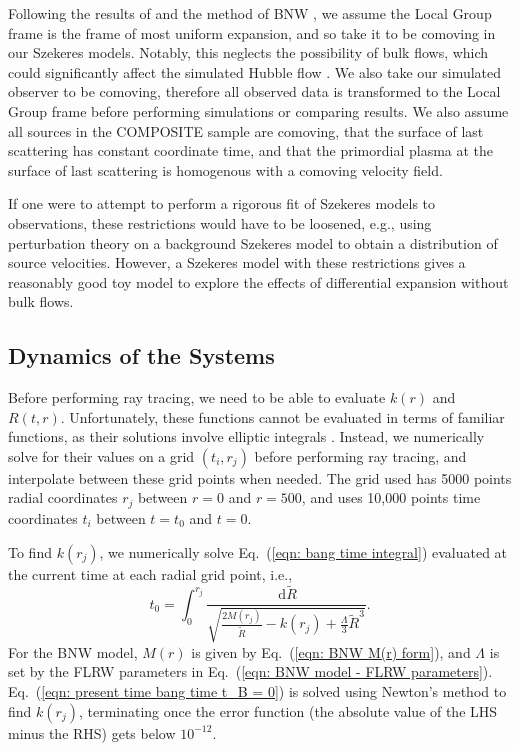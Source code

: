 \documentclass[a4paper,12pt]{report}
\newcommand{\diff}[1]{\,\text{d}{#1}}
\renewcommand{\eqref}[1]{Eq.~({#1})}
\begin{document}
Following the results of \cite{RN35,RN40} and the method of BNW \cite{RN3}, we assume the Local Group frame is the frame of most uniform expansion, and so take it to be comoving in our Szekeres models. Notably, this neglects the possibility of bulk flows, which could significantly affect the simulated Hubble flow \cite{RN122}. We also take our simulated observer to be comoving, therefore all observed data is transformed to the Local Group frame before performing simulations or comparing results. We also assume all sources in the COMPOSITE sample are comoving, that the surface of last scattering has constant coordinate time, and that the primordial plasma at the surface of last scattering is homogenous with a comoving velocity field.

If one were to attempt to perform a rigorous fit of Szekeres models to observations, these restrictions would have to be loosened, e.g., using perturbation theory on a background Szekeres model to obtain a distribution of source velocities. However, a Szekeres model with these restrictions gives a reasonably good toy model to explore the effects of differential expansion without bulk flows.

\subsection{Dynamics of the Systems}
Before performing ray tracing, we need to be able to evaluate $k(r)$ and $R(t,r)$. Unfortunately, these functions cannot be evaluated in terms of familiar functions, as their solutions involve elliptic integrals \cite{RN98}. Instead, we numerically solve for their values on a grid $(t_i, r_j)$ before performing ray tracing, and interpolate between these grid points when needed. The grid used has 5000 points radial coordinates $r_j$ between $r=0$ and $r=500$, and uses 10,000 points time coordinates $t_i$ between $t=t_0$ and $t=0$.

To find $k(r_j)$, we numerically solve \eqref{\ref{eqn: bang time integral}} evaluated at the current time at each radial grid point, i.e.,
\begin{equation}\label{eqn: present time bang time t_B = 0}
  t_0 = \int_0^{r_j} \frac{\diff{\tilde{R}}}{\sqrt{\frac{2M(r_j)}{\tilde{R}} - k(r_j) + \frac{\Lambda}{3}\tilde{R}^3}}.
\end{equation}
For the BNW model, $M(r)$ is given by \eqref{\ref{eqn: BNW M(r) form}}, and $\Lambda$ is set by the FLRW parameters in \eqref{\ref{eqn: BNW model - FLRW parameters}}. \eqref{\ref{eqn: present time bang time t_B = 0}} is solved using Newton's method to find $k(r_j)$, terminating once the error function (the absolute value of the LHS minus the RHS) gets below $10^{-12}$.
\end{document}
